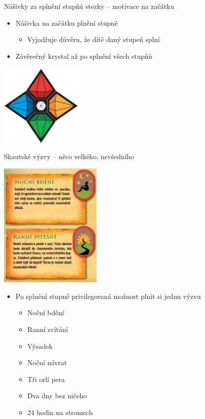 \documentclass[compress,utf8,xcolor=dvipsnames]{beamer}
\begin{document}
\begin{frame}{Nášivky za splnění stupňů stezky -- motivace na začátku}
\begin{itemize}
\item Nášivka na začátku plnění stupně
 \begin{itemize}
 \item Vyjadřuje důvěru, že dítě daný stupeň splní
 \end{itemize}
\item Závěrečný krystal až po splnění všech stupňů
\end{itemize}
\begin{center}
\includegraphics[height=4cm]{kameny.png}
\end{center}
\end{frame}

\begin{frame}{Skautské výzvy -- něco velkého, nevšedního}
\begin{multicols}{2}
\includegraphics[height=6.1cm]{vyzvy.png}
\begin{itemize}
\item Po splnění stupně privilegovaná možnost plnit si jednu výzvu
 \begin{itemize}
 \item Noční bdění
 \item Ranní svítání
 \item Výsadek
 \item Noční návrat
 \item Tři orlí pera
 \item Dva dny bez ničeho
 \item 24 hodin na stromech
 \end{itemize}
\end{itemize}
\end{multicols}
\end{frame}
\end{document}
